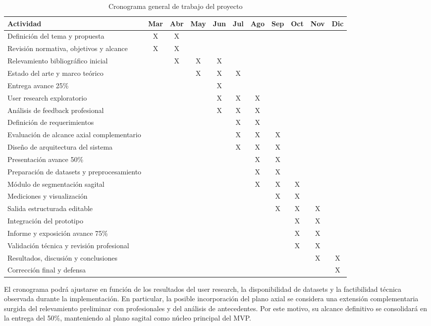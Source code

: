 \begin{table}[H]
\centering
\caption{Cronograma general de trabajo del proyecto}
\label{tab:gantt_pfi}
\scriptsize
\setlength{\tabcolsep}{2.2pt}
\begin{tabularx}{\textwidth}{p{} c c c c c c c c c c}
\hline
\textbf{Actividad} & \textbf{Mar} & \textbf{Abr} & \textbf{May} & \textbf{Jun} & \textbf{Jul} & \textbf{Ago} & \textbf{Sep} & \textbf{Oct} & \textbf{Nov} & \textbf{Dic} \\
\hline
Definición del tema y propuesta & X & X &  &  &  &  &  &  &  &  \\
Revisión normativa, objetivos y alcance & X & X &  &  &  &  &  &  &  &  \\
Relevamiento bibliográfico inicial &  & X & X & X &  &  &  &  &  &  \\
Estado del arte y marco teórico &  &  & X & X & X &  &  &  &  &  \\
Entrega avance 25\% &  &  &  & X &  &  &  &  &  &  \\
User research exploratorio &  &  &  & X & X & X &  &  &  &  \\
Análisis de feedback profesional &  &  &  & X & X & X &  &  &  &  \\
Definición de requerimientos &  &  &  &  & X & X &  &  &  &  \\
Evaluación de alcance axial complementario &  &  &  &  & X & X & X &  &  &  \\
Diseño de arquitectura del sistema &  &  &  &  & X & X & X &  &  &  \\
Presentación avance 50\% &  &  &  &  &  & X & X &  &  &  \\
Preparación de datasets y preprocesamiento &  &  &  &  &  & X & X &  &  &  \\
Módulo de segmentación sagital &  &  &  &  &  & X & X & X &  &  \\
Mediciones y visualización &  &  &  &  &  &  & X & X &  &  \\
Salida estructurada editable &  &  &  &  &  &  & X & X & X &  \\
Integración del prototipo &  &  &  &  &  &  &  & X & X &  \\
Informe y exposición avance 75\% &  &  &  &  &  &  &  & X & X &  \\
Validación técnica y revisión profesional &  &  &  &  &  &  &  & X & X &  \\
Resultados, discusión y conclusiones &  &  &  &  &  &  &  &  & X & X \\
Corrección final y defensa &  &  &  &  &  &  &  &  &  & X \\
\hline
\end{tabularx}
\end{table}

El cronograma podrá ajustarse en función de los resultados del user research, la disponibilidad de datasets y la factibilidad técnica observada durante la implementación. En particular, la posible incorporación del plano axial se considera una extensión complementaria surgida del relevamiento preliminar con profesionales y del análisis de antecedentes. Por este motivo, su alcance definitivo se consolidará en la entrega del 50\%, manteniendo al plano sagital como núcleo principal del MVP.
